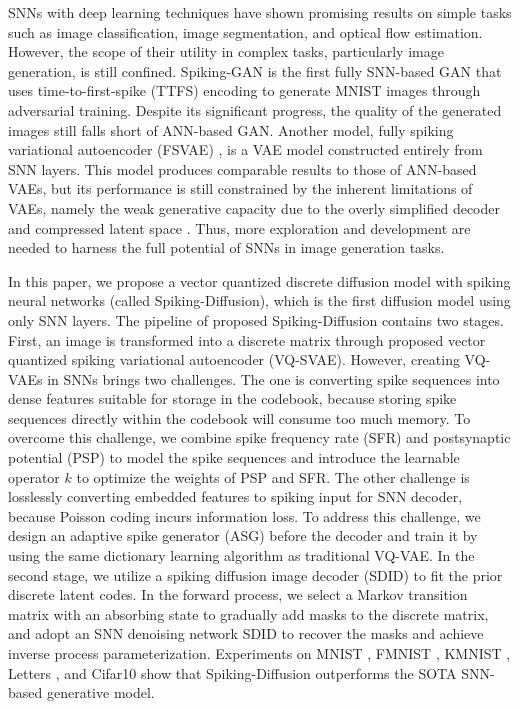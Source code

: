 \documentclass{article}
\begin{document}
SNNs with deep learning techniques have shown promising results on simple tasks such as image classification, image segmentation, and optical flow estimation\cite{snn}. However, the scope of their utility in complex tasks, particularly image generation, is still confined. Spiking-GAN \cite{b17} is the first fully SNN-based GAN that uses time-to-first-spike (TTFS) encoding to generate MNIST images through adversarial training. Despite its significant progress, the quality of the generated images still falls short of ANN-based GAN. Another model, fully spiking variational autoencoder (FSVAE) \cite{b22}, is a VAE model constructed entirely from SNN layers. This model produces comparable results to those of ANN-based VAEs, but its performance is still constrained by the inherent limitations of VAEs, namely the weak generative capacity due to the overly simplified decoder and compressed latent space \cite{b24}. Thus, more exploration and development are needed to harness the full potential of SNNs in image generation tasks. 

In this paper, we propose a vector quantized discrete diffusion model with spiking neural networks (called Spiking-Diffusion), which is the first diffusion model using only SNN layers. The pipeline of proposed Spiking-Diffusion contains two stages. First, an image is transformed into a discrete matrix through proposed vector quantized spiking variational autoencoder (VQ-SVAE). However, creating VQ-VAEs \cite{b3} in SNNs brings two challenges. The one is converting spike sequences into dense features suitable for storage in the codebook, because storing spike sequences directly within the codebook will consume too much memory. To overcome this challenge, we combine spike frequency rate (SFR) and postsynaptic potential (PSP) to model the spike sequences and introduce the learnable operator $k$ to optimize the weights of PSP and SFR. The other challenge is losslessly converting embedded features to spiking input for SNN decoder, because Poisson coding incurs information loss. To address this challenge, we design an adaptive spike generator (ASG) before the decoder and train it by using the same dictionary learning algorithm as traditional VQ-VAE. In the second stage, we utilize a spiking diffusion image decoder (SDID) to fit the prior discrete latent codes. In the forward process, we select a Markov transition matrix with an absorbing state \cite{b30} to gradually add masks to the discrete matrix, and adopt an SNN denoising network SDID to recover the masks and achieve inverse process parameterization. Experiments on MNIST \cite{b20}, FMNIST \cite{b31}, KMNIST \cite{b32}, Letters \cite{b33}, and Cifar10 \cite{cifar10} show that Spiking-Diffusion outperforms the SOTA SNN-based generative model.
\end{document}

